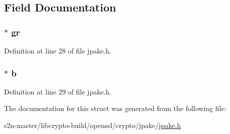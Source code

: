 \subsection{Field Documentation}
\subsubsection[{\texorpdfstring{gr}{gr}}]{$\ast$ gr}\hypertarget{struct_j_p_a_k_e___z_k_p_a911c40767fedefc91a85632bd37eeb11}{}\label{struct_j_p_a_k_e___z_k_p_a911c40767fedefc91a85632bd37eeb11}


Definition at line 28 of file jpake.\+h.

\subsubsection[{\texorpdfstring{b}{b}}]{$\ast$ b}\hypertarget{struct_j_p_a_k_e___z_k_p_a39b75e282bd52bbc10d6d26476907d03}{}\label{struct_j_p_a_k_e___z_k_p_a39b75e282bd52bbc10d6d26476907d03}


Definition at line 29 of file jpake.\+h.



The documentation for this struct was generated from the following file\+:\begin{DoxyCompactItemize}
\item 
s2n-\/master/libcrypto-\/build/openssl/crypto/jpake/\hyperlink{jpake_8h}{jpake.\+h}\end{DoxyCompactItemize}
